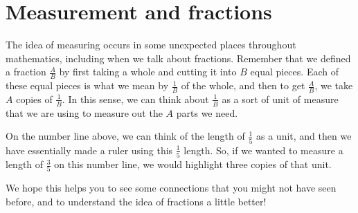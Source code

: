 \documentclass{ximera}
\begin{document}
\section{Measurement and fractions}
The idea of measuring occurs in some unexpected places throughout mathematics, including when we talk about fractions. Remember that we defined a fraction $\frac{A}{B}$ by first taking a whole and cutting it into $B$ equal pieces. Each of these equal pieces is what we mean by $\frac{1}{B}$ of the whole, and then to get $\frac{A}{B}$, we take $A$ copies of $\frac{1}{B}$. In this sense, we can think about $\frac{1}{B}$ as a sort of unit of measure that we are using to measure out the $A$ parts we need.
\begin{image}
\end{image}
On the number line above, we can think of the length of $\frac{1}{5}$ as a unit, and then we have essentially made a ruler using this $\frac{1}{5}$ length. So, if we wanted to measure a length of $\frac{3}{5}$ on this number line, we would highlight three copies of that unit.

\begin{image}
\end{image}

We hope this helps you to see some connections that you might not have seen before, and to understand the idea of fractions a little better!
\end{document}
